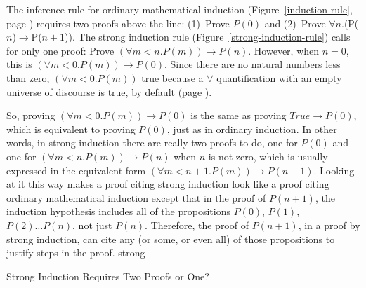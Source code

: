 \begin{aside}
The inference rule for ordinary mathematical induction
(Figure~\ref{induction-rule}, page \pageref{induction-rule})
requires two proofs above the line:
(1)~Prove $P(0)$ and (2)~Prove $\forall$$n$.(P($n$)$\rightarrow$P($n+1$)).
The strong induction rule
(Figure~\ref{strong-induction-rule})
calls for only one proof:
Prove $(\forall m<n.P(m))\rightarrow P(n)$.
However, when $n = 0$, this is
$(\forall m<0.P(m))\rightarrow P(0)$.
Since there
are no natural numbers less than zero,
$(\forall m<0.P(m))$ true because
a $\forall$ quantification with an empty universe of discourse
is true, by default
(page \pageref{empty-forall}).

So, proving $(\forall m<0.P(m))\rightarrow P(0)$
is the same as proving $True \rightarrow P(0)$,
which is equivalent to proving $P(0)$,
just as in ordinary induction.
In other words, in strong induction there are really two proofs to do,
one for $P(0)$ and one for $(\forall m<n.P(m))\rightarrow P(n)$
when $n$ is not zero, which is usually expressed in the
equivalent form $(\forall m<n+1.P(m))\rightarrow P(n+1)$.
Looking at it this way makes a proof citing strong induction look like
a proof citing ordinary mathematical induction except that
in the proof of $P(n+1)$, the
induction hypothesis
includes all of the propositions $P(0)$, $P(1)$, $P(2) \dots P(n)$, not just $P(n)$.
Therefore, the proof of $P(n+1)$, in a proof by strong induction, can cite any
(or some, or even all) of those propositions to justify steps in the proof.
strong
\caption{Strong Induction Requires Two Proofs or One?}
\label{strong-induction-rule-2-hyps-or-1}
\end{aside}

